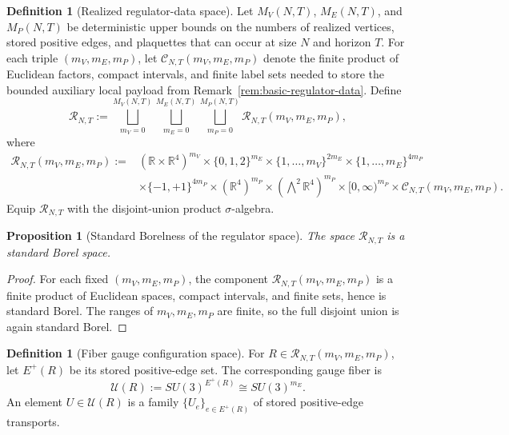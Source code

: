 \documentclass[11pt]{article}
\newtheorem{proposition}[theorem]{Proposition}
\theoremstyle{definition}
\newtheorem{definition}[theorem]{Definition}
\theoremstyle{remark}
\newcommand{\R}{\mathbb R}
\begin{document}
\begin{definition}[Realized regulator-data space]
\label{def:realized-regulator-data-space}
Let \(M_V(N,T)\), \(M_E(N,T)\), and \(M_P(N,T)\) be deterministic upper bounds
on the numbers of realized vertices, stored positive edges, and plaquettes that
can occur at size \(N\) and horizon \(T\). For each triple
\((m_V,m_E,m_P)\), let \(\mathscr C_{N,T}(m_V,m_E,m_P)\) denote the finite
product of Euclidean factors, compact intervals, and finite label sets needed
to store the bounded auxiliary local payload from
Remark~\ref{rem:basic-regulator-data}. Define
\[
\mathscr R_{N,T}
:=
\bigsqcup_{m_V=0}^{M_V(N,T)}
\bigsqcup_{m_E=0}^{M_E(N,T)}
\bigsqcup_{m_P=0}^{M_P(N,T)}
\mathscr R_{N,T}(m_V,m_E,m_P),
\]
where
\begin{align*}
\mathscr R_{N,T}(m_V,m_E,m_P)
:={}&
(\R\times\R^4)^{m_V}
\times \{0,1,2\}^{m_E}
\times \{1,\dots,m_V\}^{2m_E}
\times \{1,\dots,m_E\}^{4m_P}\\
&\times \{-1,+1\}^{4m_P}
\times (\R^4)^{m_P}
\times (\bigwedge^2\R^4)^{m_P}
\times [0,\infty)^{m_P}
\times \mathscr C_{N,T}(m_V,m_E,m_P).
\end{align*}
Equip \(\mathscr R_{N,T}\) with the disjoint-union product \(\sigma\)-algebra.
\end{definition}

\begin{proposition}[Standard Borelness of the regulator space]
\label{prop:regulator-space-standard-borel}
The space \(\mathscr R_{N,T}\) is a standard Borel space.
\end{proposition}

\begin{proof}
For each fixed \((m_V,m_E,m_P)\), the component
\(\mathscr R_{N,T}(m_V,m_E,m_P)\) is a finite product of Euclidean spaces,
compact intervals, and finite sets, hence is standard Borel. The ranges of
\(m_V,m_E,m_P\) are finite, so the full disjoint union is again standard
Borel.
\end{proof}

\begin{definition}[Fiber gauge configuration space]
\label{def:fiber-gauge-configuration-space}
For \(R\in\mathscr R_{N,T}(m_V,m_E,m_P)\), let \(E^+(R)\) be its stored
positive-edge set. The corresponding gauge fiber is
\[
\mathscr U(R):=SU(3)^{E^+(R)}\cong SU(3)^{m_E}.
\]
An element \(U\in\mathscr U(R)\) is a family \(\{U_e\}_{e\in E^+(R)}\) of
stored positive-edge transports.
\end{definition}
\end{document}
